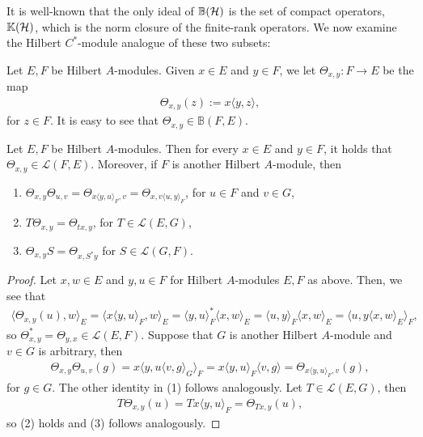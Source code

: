 It is well-known that the only ideal of $\mathbb{B}(\mathcal{H})$ is the set of compact operators, $\mathbb{K}(\mathcal{H})$, which is the norm closure of the finite-rank operators. We now examine the Hilbert $C^*$-module analogue of these two subsets:
\begin{definition}
	Let $E,F$ be Hilbert $A$-modules. Given $x \in E$ and $y \in F$, we let $\Theta_{x,y} \colon F \to E$ be the map
	\begin{align*}
		\Theta_{x,y}(z):=x \langle y,z \rangle,
	\end{align*}
	for $z \in F$. It is easy to see that $\Theta_{x,y} \in \mathbb{B}(F,E)$. 
\end{definition}
\begin{proposition}
	Let $E,F$ be Hilbert $A$-modules. Then for every $x \in E$ and $y \in F$, it holds that $\Theta_{x,y} \in \mathcal{L}(F,E)$. Moreover, if $F$ is another Hilbert $A$-module, then
	\begin{enumerate}
		\item $\Theta_{x,y}\Theta_{u,v}=\Theta_{x \langle y,u \rangle_F,v} = \Theta_{x,v \langle u,y\rangle_F}$, for $u \in F$ and $v \in G$,
		\item $T \Theta_{x,y} = \Theta_{tx,y}$, for $T \in \mathcal{L}(E,G)$,
		\item $\Theta_{x,y}S = \Theta_{x,S^* y}$ for $S \in \mathcal{L}(G,F)$.
	\end{enumerate}
	\label{frnkideal}
\end{proposition}
\begin{proof}
Let $x,w \in E$ and $y,u \in F$ for Hilbert $A$-modules $E,F$ as above. Then, we see that
\begin{align*}
		\langle \Theta_{x,y}(u),w\rangle_E = \langle x \langle y,u\rangle_{F}, w\rangle_{E} =  \langle y,u \rangle_F^* \langle x,w\rangle_E = \langle u,y \rangle_F \langle x,w\rangle_E = \langle u, y\langle x,w\rangle_E \rangle_F,
\end{align*}
so $\Theta_{x,y}^* = \Theta_{y,x} \in \mathcal{L}(E,F)$. Suppose that $G$ is another Hilbert $A$-module and $v \in G$ is arbitrary, then
\begin{align*}
	\Theta_{x,y}\Theta_{u,v}(g) = x \langle y, u \langle v,g \rangle_G \rangle_F = x \langle y, u \rangle_F \langle v,g \rangle=\Theta_{x \langle y,u \rangle_F, v}(g),
\end{align*}
for $g \in G$. The other identity in (1) follows analogously. Let $T \in \mathcal{L}(E,G)$, then
\begin{align*}
	T \Theta_{x,y}(u) = T x \langle y,u \rangle_F = \Theta_{Tx,y}(u),
\end{align*}
so (2) holds and (3) follows analogously.
\end{proof}
